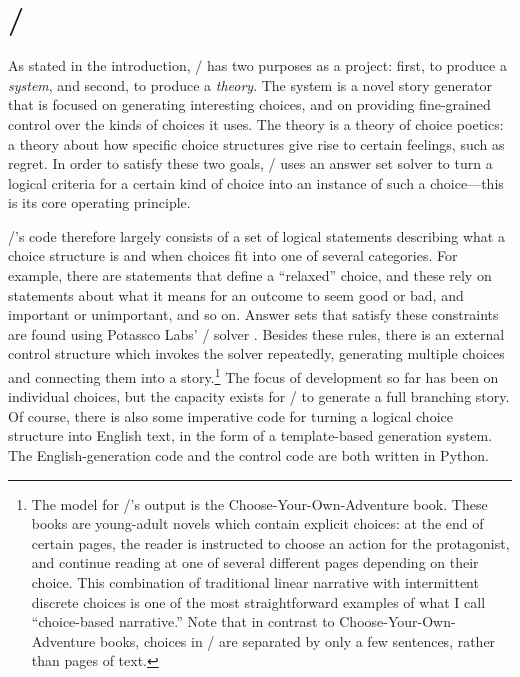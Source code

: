 \chapter{\dunyazad/}

\label{ch:dunyazad}%


As stated in the introduction, \dunyazad/ has two purposes as a project: first, to produce a \emph{system}, and second, to produce a \emph{theory}.
%
The system is a novel story generator that is focused on generating interesting choices, and on providing fine-grained control over the kinds of choices it uses.
%
The theory is a theory of choice poetics: a theory about how specific choice structures give rise to certain feelings, such as regret.
%
In order to satisfy these two goals, \dunyazad/ uses an answer set solver to turn a logical criteria for a certain kind of choice into an instance of such a choice---this is its core operating principle.


\dunyazad/'s code therefore largely consists of a set of logical statements describing what a choice structure is and when choices fit into one of several categories.
%
For example, there are statements that define a ``relaxed'' choice, and these rely on statements about what it means for an outcome to seem good or bad, and important or unimportant, and so on.
%
Answer sets that satisfy these constraints are found using Potassco Labs' \clingo/ solver \citep{Gebser2011}.
%
Besides these rules, there is an external control structure which invokes the solver repeatedly, generating multiple choices and connecting them into a story.\footnote{
The model for \dunyazad/'s output is the Choose-Your-Own-Adventure book.
%
These books are young-adult novels which contain explicit choices: at the end of certain pages, the reader is instructed to choose an action for the protagonist, and continue reading at one of several different pages depending on their choice.
%
This combination of traditional linear narrative with intermittent discrete choices is one of the most straightforward examples of what I call ``choice-based narrative.''
%
Note that in contrast to Choose-Your-Own-Adventure books, choices in \dunyazad/ are separated by only a few sentences, rather than pages of text.}
%
The focus of development so far has been on individual choices, but the capacity exists for \dunyazad/ to generate a full branching story.
%
Of course, there is also some imperative code for turning a logical choice structure into English text, in the form of a template-based generation system.
%
The English-generation code and the control code are both written in Python.


